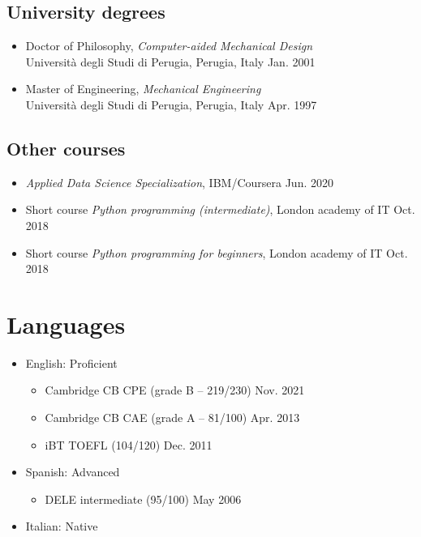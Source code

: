 \documentclass[11pt]{article}
\begin{document}
\subsection*{University degrees}

\begin{itemize}
\item Doctor of Philosophy, 
\emph{Computer-aided Mechanical Design} \\ 
Università degli Studi di Perugia, Perugia, Italy \hfill Jan. 2001 

\item Master of Engineering, \emph{Mechanical Engineering} \\ 
Università degli Studi di Perugia, Perugia, Italy \hfill Apr. 1997
\end{itemize}

\subsection*{Other courses}

\begin{itemize}

\item \emph{Applied Data Science Specialization}, IBM/Coursera \hfill Jun. 2020
\item Short course \emph{Python programming (intermediate)}, London academy of IT \hfill Oct. 2018
\item Short course \emph{Python programming for beginners}, London academy of IT \hfill Oct. 2018

\end{itemize}

\section*{Languages} 

\begin{itemize}

	\item English: Proficient
	\begin{itemize}
		\item Cambridge CB CPE (grade B -- 219/230) \hfill Nov. 2021
		\item Cambridge CB CAE (grade A -- 81/100) \hfill Apr. 2013
		\item iBT TOEFL (104/120) \hfill Dec. 2011
	\end{itemize}
	\item Spanish: Advanced
	\begin{itemize}
		\item DELE intermediate (95/100) \hfill May 2006
	\end{itemize}\textbf{}
	\item Italian: Native
	
\end{itemize}
\end{document}
